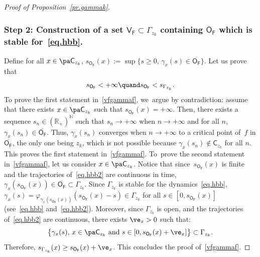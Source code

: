 \begin{proof}[Proof of Proposition~\ref{pr.gammak}]
\subsubsection*{Step 2: Construction of a set $\mathsf V_{\mathsf F}\subset \Gamma_{z_k}$ containing $\mathsf O_{\mathsf F}$ which is stable for~\eqref{eq.hbb}. }
Define for all $x\in \pa \mathsf C_{z_k}$, $ s_{\mathsf O_{\mathsf F}}(x):=\sup \{s\ge 0, \, \gamma_x(s) \in\overline{\mathsf O_{\mathsf F}}\}$. Let us prove that
\begin{equation}\label{vfgammaf}
s_{\mathsf O_{\mathsf F}} <+\infty \quand s_{\mathsf O_{\mathsf F}}< s_{\Gamma_{z_k}}.
\end{equation}
To prove the first statement in~\eqref{vfgammaf}, we~argue by contradiction:
assume that there exists $x\in \pa \mathsf C_{z_k}$ such that $s_{\mathsf O_{\mathsf F}}(x)=+\infty$. Then, there exists a sequence $s_n\in (\mathbb R_+)^{\mathbb N}$ such that $s_n\to +\infty$ when $n \to +\infty$ and for all $n$, $\gamma_x(s_n)\in \overline{\mathsf O_{\mathsf F}}$. Thus, $\gamma_x(s_n)$ converges when $n\to +\infty$ to a critical point of~$f$ in $\overline{\mathsf O_{\mathsf F}}$, the only one being $z_k$, which is not possible because $\gamma_x(s_n)\notin { \mathsf C_{z_k}}$ for all $n$.
This proves the first statement in~\eqref{vfgammaf}. To~prove the second statement in~\eqref{vfgammaf}, let us consider $x\in \pa \mathsf C_{z_k}$. Notice that since~$s_{\mathsf O_{\mathsf F}}(x)$ is finite and the trajectories of~\eqref{eq.hbb2} are continuous in time, $\gamma_x(s_{\mathsf O_{\mathsf F}}(x)) \in
\overline{\mathsf O_{\mathsf F}} \subset \Gamma_{z_k}$. Since $\Gamma_{z_k}$ is stable for the dynamics~\eqref{eq.hbb}, \hbox{$\gamma_x(s)=\varphi_{\gamma_x(s_{\mathsf O_{\mathsf F}}(x))} (s_{\mathsf O_{\mathsf F}}(x)-s) \in \Gamma_{z_k}$} for all $s\in [0,s_{\mathsf O_{\mathsf F}}(x)]$ (see~\eqref{eq.hbb} and~\eqref{eq.hbb2}).
Moreover, since $\Gamma_{z_k}$ is open, and the trajectories of~\eqref{eq.hbb2} are continuous, there exists $\ve_x>0$ such that:
\begin{equation}\label{inclutube}
\big \{ \gamma_x(s), \, x\in \pa \mathsf C_{z_k} \text{ and } s\in [0,s_{\mathsf O_{\mathsf F}}(x)+\ve_x]\big \} \subset \Gamma_{z_k}.
\end{equation}
Therefore, $ s_{\Gamma_{z_k}}(x)\ge s_{\mathsf O_{\mathsf
F}}(x)+\ve_x$. This concludes the proof of~\eqref{vfgammaf}.


\end{proof}
